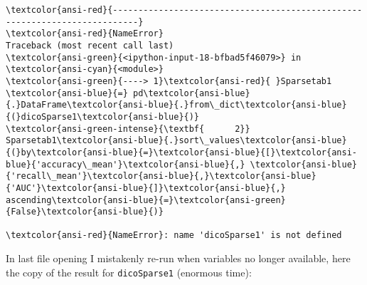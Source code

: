 \documentclass[11pt]{article}
\begin{document}
    \begin{Verbatim}[commandchars=\\\{\}, frame=single, framerule=2mm, rulecolor=\color{outerrorbackground}]
\textcolor{ansi-red}{---------------------------------------------------------------------------}
\textcolor{ansi-red}{NameError}                                 Traceback (most recent call last)
\textcolor{ansi-green}{<ipython-input-18-bfbad5f46079>} in \textcolor{ansi-cyan}{<module>}
\textcolor{ansi-green}{----> 1}\textcolor{ansi-red}{ }Sparsetab1 \textcolor{ansi-blue}{=} pd\textcolor{ansi-blue}{.}DataFrame\textcolor{ansi-blue}{.}from\_dict\textcolor{ansi-blue}{(}dicoSparse1\textcolor{ansi-blue}{)}
\textcolor{ansi-green-intense}{\textbf{      2}} Sparsetab1\textcolor{ansi-blue}{.}sort\_values\textcolor{ansi-blue}{(}by\textcolor{ansi-blue}{=}\textcolor{ansi-blue}{[}\textcolor{ansi-blue}{'accuracy\_mean'}\textcolor{ansi-blue}{,} \textcolor{ansi-blue}{'recall\_mean'}\textcolor{ansi-blue}{,}\textcolor{ansi-blue}{'AUC'}\textcolor{ansi-blue}{]}\textcolor{ansi-blue}{,} ascending\textcolor{ansi-blue}{=}\textcolor{ansi-green}{False}\textcolor{ansi-blue}{)}

\textcolor{ansi-red}{NameError}: name 'dicoSparse1' is not defined
    \end{Verbatim}

    In last file opening I mistakenly re-run when variables no longer
available, here the copy of the result for \texttt{dicoSparse1}
(enormous time):
\end{document}
